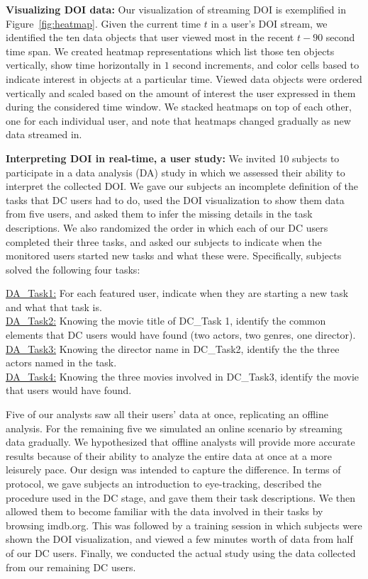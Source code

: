 \textbf{Visualizing DOI data:}  Our visualization of streaming DOI is exemplified in Figure~\ref{fig:heatmap}. Given the current time $t$ in a user's DOI stream, we identified the ten data objects that user viewed most in the recent $t-90$ second time span. We created heatmap representations which list those ten objects vertically, show time horizontally in $1$ second increments, and color cells based to indicate interest in objects at a particular time. Viewed data objects were ordered vertically and scaled based on the amount of interest the user expressed in them during the considered time window. We stacked heatmaps on top of each other, one for each individual user, and note that heatmaps changed gradually as new data streamed in.

\textbf{Interpreting DOI in real-time, a user study:} We invited 10 subjects to participate in a data analysis (DA) study in which we assessed their ability to interpret the collected DOI. We gave our subjects an incomplete definition of the tasks that DC users had to do, used the DOI visualization to show them data from five users, and asked them to infer the missing details in the task descriptions. We also randomized the order in which each of our DC users completed their three tasks, and asked our subjects to indicate when the monitored users started new tasks and what these were. Specifically, subjects solved the following four tasks:  


\noindent
\underline{DA\_Task1:} For each featured user, indicate when they are starting a new task and what that task is.\\
\underline{DA\_Task2:} Knowing the movie title of DC\_Task 1, identify the common elements that DC users would have found (two actors, two genres, one director).\\
\underline{DA\_Task3:} Knowing the director name in DC\_Task2, identify the the three actors named in the task.\\
\underline{DA\_Task4:} Knowing the three movies involved in DC\_Task3, identify the movie that users would have found. 

Five of our analysts saw all their users' data at once, replicating an offline analysis. For the remaining five we simulated an online scenario  by streaming data gradually. We hypothesized that offline analysts will provide more accurate results because of their ability to analyze the entire data at once at a more leisurely pace. Our design was intended to capture the difference.  In terms of protocol, we gave subjects an introduction to eye-tracking, described the procedure used in the DC stage, and gave them their task descriptions. We then allowed them to become familiar with the data involved in their tasks by browsing imdb.org. This was followed by a training session in which subjects were shown the DOI visualization, and viewed a few minutes worth of data from half of our DC users. Finally, we conducted the actual study using the data collected from our remaining DC users.   



